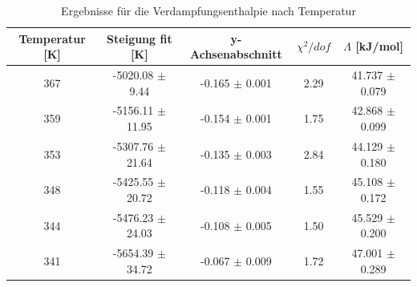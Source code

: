 \documentclass[12pt,a4paper]{article}
\begin{document}
\begin{table}
	\begin{tabular}{|c|c|c|c|c|}
		\hline
		\textbf{Temperatur [K]} & \textbf{Steigung fit [K]} & \textbf{y-Achsenabschnitt} & $\chi ^2/dof$ & \textbf{$\Lambda$ [kJ/mol]} \\
		\hline
		367 & -5020.08 $\pm$ 9.44 & -0.165 $\pm$ 0.001 & 2.29 & 41.737 $\pm$ 0.079 \\
		\hline
		359 & -5156.11 $\pm$ 11.95 & -0.154 $\pm$ 0.001 & 1.75 & 42.868 $\pm$ 0.099 \\
		\hline
		353 & -5307.76 $\pm$ 21.64 & -0.135 $\pm$ 0.003 & 2.84 & 44.129 $\pm$ 0.180 \\
		\hline
		348 & -5425.55 $\pm$ 20.72 & -0.118 $\pm$ 0.004 & 1.55 & 45.108 $\pm$ 0.172 \\
		\hline
		344 & -5476.23 $\pm$ 24.03 & -0.108 $\pm$ 0.005 & 1.50 & 45.529 $\pm$ 0.200 \\
		\hline
		341 & -5654.39 $\pm$ 34.72 & -0.067 $\pm$ 0.009 & 1.72 & 47.001 $\pm$ 0.289 \\
		\hline
	\end{tabular}
	\caption{Ergebnisse für die Verdampfungsenthalpie nach Temperatur}
	\label{tab:enthalpie_B}
\end{table}
\end{document}
